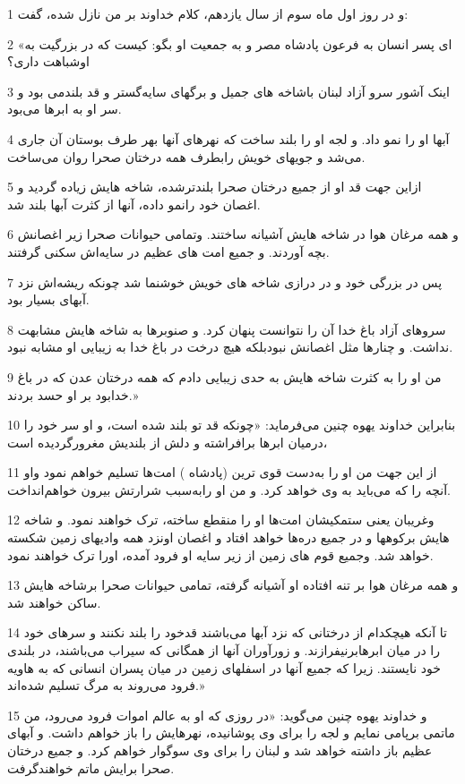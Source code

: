 \par 1 و در روز اول ماه سوم از سال یازدهم، کلام خداوند بر من نازل شده، گفت:
\par 2 «ای پسر انسان به فرعون پادشاه مصر و به جمعیت او بگو: کیست که در بزرگیت به اوشباهت داری؟
\par 3 اینک آشور سرو آزاد لبنان باشاخه های جمیل و برگهای سایه‌گستر و قد بلندمی بود و سر او به ابرها می‌بود.
\par 4 آبها او را نمو داد. و لجه او را بلند ساخت که نهرهای آنها بهر طرف بوستان آن جاری می‌شد و جویهای خویش رابطرف همه درختان صحرا روان می‌ساخت.
\par 5 ازاین جهت قد او از جمیع درختان صحرا بلندترشده، شاخه هایش زیاده گردید و اغصان خود رانمو داده، آنها از کثرت آبها بلند شد.
\par 6 و همه مرغان هوا در شاخه هایش آشیانه ساختند. وتمامی حیوانات صحرا زیر اغصانش بچه آوردند. و جمیع امت های عظیم در سایه‌اش سکنی گرفتند.
\par 7 پس در بزرگی خود و در درازی شاخه های خویش خوشنما شد چونکه ریشه‌اش نزد آبهای بسیار بود.
\par 8 سروهای آزاد باغ خدا آن را نتوانست پنهان کرد. و صنوبرها به شاخه هایش مشابهت نداشت. و چنارها مثل اغصانش نبودبلکه هیچ درخت در باغ خدا به زیبایی او مشابه نبود.
\par 9 من او را به کثرت شاخه هایش به حدی زیبایی دادم که همه درختان عدن که در باغ خدابود بر او حسد بردند.»
\par 10 بنابراین خداوند یهوه چنین می‌فرماید: «چونکه قد تو بلند شده است، و او سر خود را درمیان ابرها برافراشته و دلش از بلندیش مغرورگردیده است،
\par 11 از این جهت من او را به‌دست قوی ترین (پادشاه ) امت‌ها تسلیم خواهم نمود واو آنچه را که می‌باید به وی خواهد کرد. و من او رابه‌سبب شرارتش بیرون خواهم‌انداخت.
\par 12 وغریبان یعنی ستمکیشان امت‌ها او را منقطع ساخته، ترک خواهند نمود. و شاخه هایش برکوهها و در جمیع دره‌ها خواهد افتاد و اغصان اونزد همه وادیهای زمین شکسته خواهد شد. وجمیع قوم های زمین از زیر سایه او فرود آمده، اورا ترک خواهند نمود.
\par 13 و همه مرغان هوا بر تنه افتاده او آشیانه گرفته، تمامی حیوانات صحرا برشاخه هایش ساکن خواهند شد.
\par 14 تا آنکه هیچکدام از درختانی که نزد آبها می‌باشند قدخود را بلند نکنند و سرهای خود را در میان ابرهابرنیفرازند. و زورآوران آنها از همگانی که سیراب می‌باشند، در بلندی خود نایستند. زیرا که جمیع آنها در اسفلهای زمین در میان پسران انسانی که به هاویه فرود می‌روند به مرگ تسلیم شده‌اند.»
\par 15 و خداوند یهوه چنین می‌گوید: «در روزی که او به عالم اموات فرود می‌رود، من ماتمی برپامی نمایم و لجه را برای وی پوشانیده، نهرهایش را باز خواهم داشت. و آبهای عظیم باز داشته خواهد شد و لبنان را برای وی سوگوار خواهم کرد. و جمیع درختان صحرا برایش ماتم خواهندگرفت.
